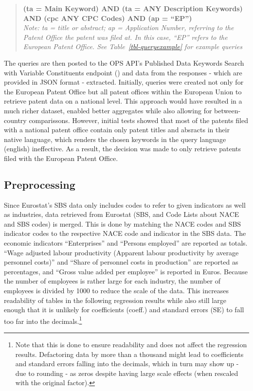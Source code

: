 \documentclass[
  11,
  a4paperpaper,
]{article}
\begin{document}

\begin{quote}
\textbf{(ta = Main Keyword) AND (ta = ANY Description Keywords) AND (cpc
ANY CPC Codes) AND (ap = ``EP'')}\\
\emph{Note: ta = title or abstract; ap = Application Number, referring
to the Patent Office the patent was filed at. In this case, ``EP''
refers to the European Patent Office. See Table~\ref{tbl-queryexample}
for example queries}
\end{quote}


The queries are then posted to the OPS API's Published Data Keywords
Search with Variable Constituents endpoint
() and data from the responses - which are provided in JSON
format - extracted. Initially, queries were created not only for the
European Patent Office but all patent offices within the European Union
to retrieve patent data on a national level. This approach would have
resulted in a much richer dataset, enabled better aggregates while also
allowing for between-country comparissons. However, initial tests showed
that most of the patents filed with a national patent office contain
only patent titles and absracts in their native language, which renders
the chosen keywords in the query language (english) ineffective. As a
result, the decision was made to only retrieve patents filed with the
European Patent Office.

\subsection{Preprocessing}\label{sec-preprocessing}

Since Eurostat's SBS data only includes codes to refer to given
indicators as well as industries, data retrieved from Eurostat (SBS, and
Code Lists about NACE and SBS codes) is merged. This is done by matching
the NACE codes and SBS indicator codes to the respective NACE code and
indicator in the SBS data. The economic indicators ``Enterprises'' and
``Persons employed'' are reported as totals. ``Wage adjusted labour
productivity (Apparent labour productivity by average personnel costs)''
and ``Share of personnel costs in production'' are reported as
percentages, and ``Gross value added per employee'' is reported in
Euros. Because the number of employees is rather large for each
industry, the number of employees is divided by 1000 to reduce the scale
of the data. This increases readability of tables in the following
regression results while also still large enough that it is unlikely for
coefficients (coeff.) and standard errors (SE) to fall too far into the
decimals.\footnote{Note that this is done to ensure readability and does
  not affect the regression results. Defactoring data by more than a
  thousand might lead to coefficients and standard errors falling into
  the decimals, which in turn may show up - due to rounding - as zeros
  despite having large scale effects (when rescaled with the original
  factor).\label{note3}}
\end{document}

